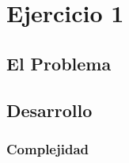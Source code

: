\section{Ejercicio 1}

\subsection{El Problema}

\subsection{Desarrollo}

\subsubsection{Complejidad}
